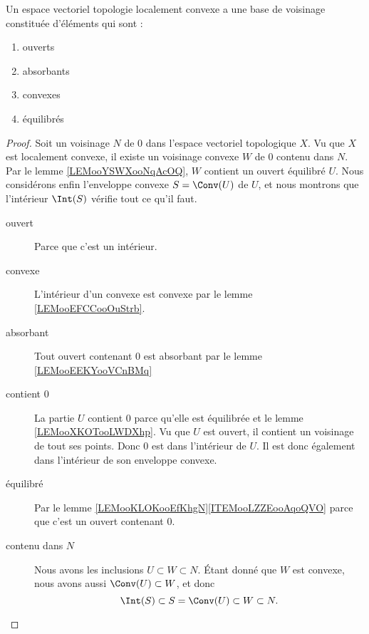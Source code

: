 \begin{proposition}		\label{PROPooOAXHooOGhRbu}
	Un espace vectoriel topologie localement convexe a une base de voisinage constituée d'éléments qui sont :
	\begin{enumerate}
		\item
		      ouverts
		\item
		      absorbants
		\item
		      convexes
		\item
		      équilibrés
	\end{enumerate}
\end{proposition}

\begin{proof}
	Soit un voisinage \( N\) de \( 0\) dans l'espace vectoriel topologique \( X\). Vu que \( X\) est localement convexe, il existe un voisinage convexe \( W\) de \( 0\) contenu dans \( N\). Par le lemme \ref{LEMooYSWXooNqAcOQ}, \( W\) contient un ouvert équilibré \( U\). Nous considérons enfin l'enveloppe convexe \( S=\Conv(U)\) de \( U\), et nous montrons que l'intérieur \( \Int(S)\) vérifie tout ce qu'il faut.

	\begin{description}
		\item[ouvert] Parce que c'est un intérieur.
		\item[convexe] L'intérieur d'un convexe est convexe par le lemme \ref{LEMooEFCCooOuStrb}.
		\item[absorbant] Tout ouvert contenant \( 0\) est absorbant par le lemme \ref{LEMooEEKYooVCnBMq}
		\item[contient \( 0\)] La partie \( U\) contient \( 0\) parce qu'elle est équilibrée et le lemme \ref{LEMooXKOTooLWDXhp}. Vu que \( U\) est ouvert, il contient un voisinage de tout ses points. Donc \( 0\) est dans l'intérieur de \( U\). Il est donc également dans l'intérieur de son enveloppe convexe.
		\item[équilibré] Par le lemme \ref{LEMooKLOKooEfKhgN}\ref{ITEMooLZZEooAqoQVO} parce que c'est un ouvert contenant \( 0\).
		\item[contenu dans \( N\)] Nous avons les inclusions \( U\subset W\subset N\). Étant donné que \( W\) est convexe, nous avons aussi \( \Conv(U)\subset W\), et donc
		      \begin{equation}
			      \Int(S)\subset S=\Conv(U)\subset W\subset N.
		      \end{equation}
	\end{description}
\end{proof}

